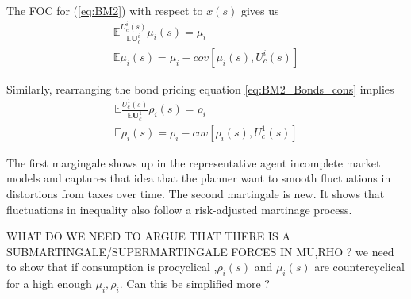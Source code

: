 \documentclass[thmsb,11pt]{article}
\begin{document}

The FOC for (\ref{eq:BM2}) with respect to $x(s)$ gives us%
\begin{align}
\mathbb{E} \frac{U^i_c(s)}{\mathbb{E}\bm{U}^i_c}\mu_i(s)=\mu_i\\
\mathbb{E} \mu_i(s)=\mu_i-cov\left[\mu_i(s),U^i_c(s)\right]
 \end{align}

 Similarly, rearranging the bond pricing equation \eqref{eq:BM2_Bonds_cons} implies
\begin{align}
\mathbb{E} \frac{U^1_c(s)}{\mathbb{E}\bm{U}^1_c}\rho_i(s)=\rho_i\\
\mathbb{E} \rho_i(s)=\rho_i-cov\left[\rho_i(s),U^1_c(s)\right]
 \end{align}

The first margingale shows up in the representative agent incomplete market models and captures that idea that the planner want to smooth fluctuations in distortions from taxes over time. The second martingale is new. It shows that fluctuations in inequality also follow a risk-adjusted martinage process.

\color{blue}{Anmol } WHAT DO WE NEED TO ARGUE THAT THERE IS A SUBMARTINGALE/SUPERMARTINGALE FORCES IN MU,RHO ? we need to show that if consumption is procyclical ,$\rho_i(s)$ and $\mu_i(s)$ are countercyclical  for a high enough $\mu_i,\rho_i$. Can this be simplified more ?
\end{document}
